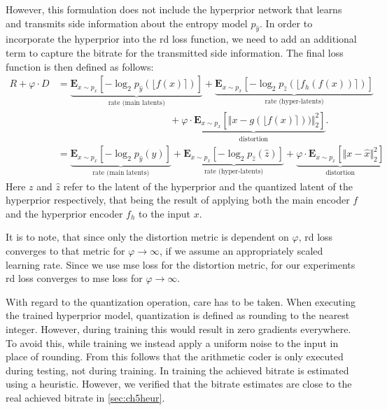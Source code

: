 However, this formulation does not include the hyperprior network that learns and transmits side information about the entropy model $p_{\hat{y}}$. In order to incorporate the hyperprior into the \ac{rd} loss function, we need to add an additional term to capture the bitrate for the transmitted side information. The final loss function is then defined as follows:
\begin{align}
R + \varphi \cdot D &= \underbrace{\mathbf{E}_{x\sim p_x} [ -\log_2 p_{\hat{y}}(\lfloor f(x)\rceil)]}_\text{rate (main latents)} + 
\underbrace{\mathbf{E}_{x\sim p_x} [ -\log_2 p_{\hat{z}}(\lfloor f_h(f(x))\rceil)]}_\text{rate (hyper-latents)} \nonumber\\
&\qquad\qquad\qquad\qquad\qquad\quad\:\: + \underbrace{\varphi \cdot\mathbf{E}_{x\sim p_x} [\Vert x - g(\lfloor f(x)\rceil))\Vert^2_2]}_\text{distortion}.\nonumber\\
&=\underbrace{\mathbf{E}_{x\sim p_x} [ -\log_2 p_{\hat{y}}(\hat{y})]}_\text{rate (main latents)} + 
\underbrace{\mathbf{E}_{x\sim p_x} [ -\log_2 p_{\hat{z}}(\hat{z})]}_\text{rate (hyper-latents)} + \underbrace{\varphi \cdot\mathbf{E}_{x\sim p_x} [\Vert x - \hat{x}\Vert^2_2]}_\text{distortion}
\end{align}
Here $z$ and $\hat{z}$ refer to the latent of the hyperprior and the quantized latent of the hyperprior respectively, that being the result of applying both the main encoder $f$ and the hyperprior encoder $f_h$ to the input $x$.

It is to note, that since only the distortion metric is dependent on $\varphi$, \ac{rd} loss converges to that metric for $\varphi\rightarrow\infty$, if we assume an appropriately scaled learning rate. Since we use \ac{mse} loss for the distortion metric, for our experiments \ac{rd} loss converges to \ac{mse} loss for $\varphi\rightarrow\infty$.

With regard to the quantization operation, care has to be taken. When executing the trained hyperprior model, quantization is defined as rounding to the nearest integer. However, during training this would result in zero gradients everywhere. To avoid this, while training we instead apply a uniform noise to the input in place of rounding. From this follows that the arithmetic coder is only executed during testing, not during training. In training the achieved bitrate is estimated using a heuristic. However, we verified that the bitrate estimates are close to the real achieved bitrate in \autoref{sec:ch5heur}.
